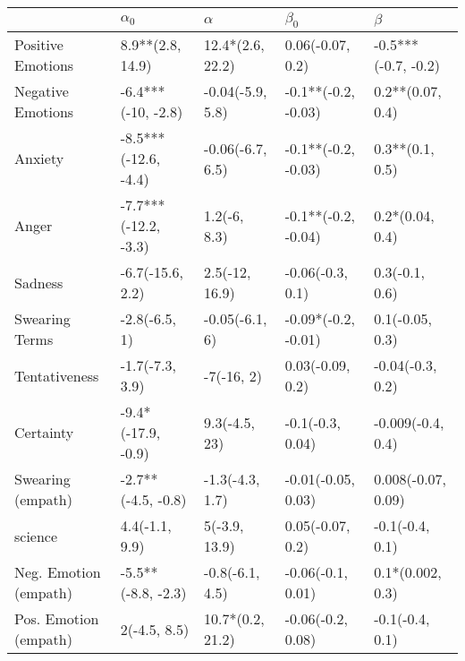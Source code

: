 \begin{tabular}{lllll}
\toprule
{} &            $\alpha_0$ &          $\alpha$ &            $\beta_0$ &              $\beta$ \\
\midrule
Positive Emotions     &      8.9**(2.8, 14.9) &  12.4*(2.6, 22.2) &     0.06(-0.07, 0.2) &  -0.5***(-0.7, -0.2) \\
Negative Emotions     &    -6.4***(-10, -2.8) &  -0.04(-5.9, 5.8) &  -0.1**(-0.2, -0.03) &     0.2**(0.07, 0.4) \\
Anxiety               &  -8.5***(-12.6, -4.4) &  -0.06(-6.7, 6.5) &  -0.1**(-0.2, -0.03) &      0.3**(0.1, 0.5) \\
Anger                 &  -7.7***(-12.2, -3.3) &      1.2(-6, 8.3) &  -0.1**(-0.2, -0.04) &      0.2*(0.04, 0.4) \\
Sadness               &      -6.7(-15.6, 2.2) &    2.5(-12, 16.9) &     -0.06(-0.3, 0.1) &       0.3(-0.1, 0.6) \\
Swearing Terms        &         -2.8(-6.5, 1) &    -0.05(-6.1, 6) &  -0.09*(-0.2, -0.01) &      0.1(-0.05, 0.3) \\
Tentativeness         &       -1.7(-7.3, 3.9) &        -7(-16, 2) &     0.03(-0.09, 0.2) &     -0.04(-0.3, 0.2) \\
Certainty             &    -9.4*(-17.9, -0.9) &     9.3(-4.5, 23) &     -0.1(-0.3, 0.04) &    -0.009(-0.4, 0.4) \\
Swearing (empath)     &    -2.7**(-4.5, -0.8) &   -1.3(-4.3, 1.7) &   -0.01(-0.05, 0.03) &   0.008(-0.07, 0.09) \\
science               &        4.4(-1.1, 9.9) &     5(-3.9, 13.9) &     0.05(-0.07, 0.2) &      -0.1(-0.4, 0.1) \\
Neg. Emotion (empath) &    -5.5**(-8.8, -2.3) &   -0.8(-6.1, 4.5) &    -0.06(-0.1, 0.01) &     0.1*(0.002, 0.3) \\
Pos. Emotion (empath) &          2(-4.5, 8.5) &  10.7*(0.2, 21.2) &    -0.06(-0.2, 0.08) &      -0.1(-0.4, 0.1) \\
\bottomrule
\end{tabular}
